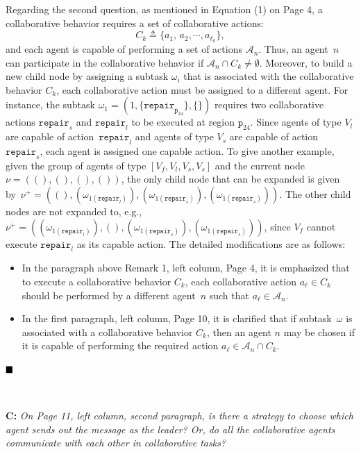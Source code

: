 \documentclass[10pt]{article}
\begin{document}
Regarding the second question, as mentioned in Equation (1) on Page 4,
a collaborative behavior requires a set of collaborative actions:
$$C_k\triangleq \{a_1,\,a_2,\cdots,a_{\ell_k}\},$$ and each agent
is capable of performing a set of actions $\mathcal{A}_n$.
Thus, an agent~$n$ can participate in the collaborative behavior
if $\mathcal{A}_n\cap C_k\neq \emptyset$.
Moreover, to build a new child node by assigning a subtask $\omega_i$
that is associated with the collaborative behavior $C_k$,
each collaborative action must be assigned to a different agent.
For instance, the subtask $\omega_1=(1,\{\texttt{repair}_{\texttt{p}_{24}}\},\{\})$
requires two collaborative actions $\texttt{repair}_s$ and $\texttt{repair}_l$
to be executed at region $\texttt{p}_{24}$.
Since agents of type $V_l$ are capable of action~$\texttt{repair}_l$ and agents of type $V_s$
are capable of action $\texttt{repair}_s$,
each agent is assigned one capable action.
To give another example, given the group of agents of type $[V_f,V_l,V_s,V_s]$ and the current node $\nu=((),(),(),())$,
the only child node that can be expanded is given by~$\nu^+=((), (\omega_{1(\texttt{repair}_l)}),(\omega_{1(\texttt{repair}_s)}),(\omega_{1(\texttt{repair}_s)}))$.
The other child nodes are not expanded to, e.g.,
$\nu^+=((\omega_{1(\texttt{repair}_l)}),(),(\omega_{1(\texttt{repair}_s)}),(\omega_{1(\texttt{repair}_s)}))$, since $V_f$ cannot execute $\texttt{repair}_l$ as its capable action.
The detailed modifications are as follows:
\begin{itemize}
\item In the paragraph above Remark 1, left column, Page 4, it is emphasized that
to execute a collaborative behavior $C_k$, each collaborative action $a_{\ell}\in C_k$
should be performed by a different agent~$n$ such that $a_\ell\in \mathcal{A}_n$.

\item In the first paragraph, left column, Page 10, it is clarified that
if subtask~$\omega$ is associated with a collaborative behavior $C_k$, then
an agent $n$ may be chosen if it is capable of performing
the required action $a_\ell\in\mathcal{A}_n\cap C_k$.
\end{itemize}
$\hfill\blacksquare$




\hspace*{\fill} \




\textbf{C:}
\emph{On Page 11, left column, second paragraph, is there a strategy to
	choose which agent sends out the message as the leader? Or, do all the
	collaborative agents communicate with each other in collaborative
	tasks?
}
\end{document}
